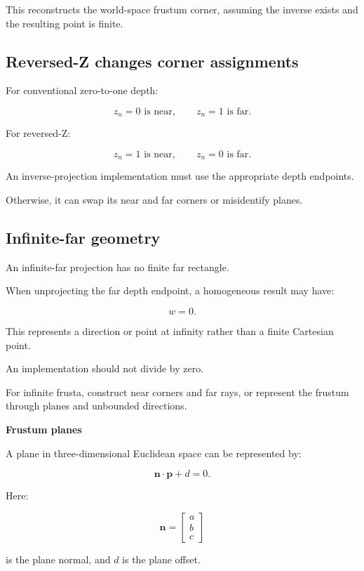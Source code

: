 This reconstructs the world-space frustum corner, assuming the inverse exists and the resulting point is finite.

\subsection{Reversed-Z changes corner assignments}\label{02-foundations-ii-ch034-reversed-z-changes-corner-assignments}

For conventional zero-to-one depth:

\[
 z_n=0 \text{ is near},\qquad z_n=1 \text{ is far}.
\]

For reversed-Z:

\[
 z_n=1 \text{ is near},\qquad z_n=0 \text{ is far}.
\]

An inverse-projection implementation must use the appropriate depth endpoints.

Otherwise, it can swap its near and far corners or misidentify planes.

\subsection{Infinite-far geometry}\label{02-foundations-ii-ch034-infinite-far-geometry}

An infinite-far projection has no finite far rectangle.

When unprojecting the far depth endpoint, a homogeneous result may have:

\[
 w=0.
\]

This represents a direction or point at infinity rather than a finite Cartesian point.

An implementation should not divide by zero.

For infinite frusta, construct near corners and far rays, or represent the frustum through planes and unbounded directions.

\textbf{Frustum planes}

A plane in three-dimensional Euclidean space can be represented by:

\[
 \boxed{ \mathbf n\cdot\mathbf p+d=0 }.
\]

Here:

\[
 \mathbf n= \begin{bmatrix}a\\b\\c\end{bmatrix}
\]

is the plane normal, and \(d\) is the plane offset.

